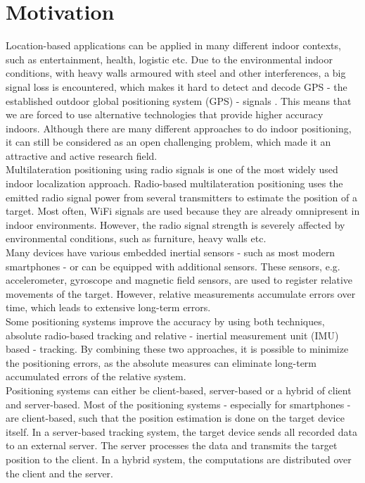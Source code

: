 \section{Motivation}
Location-based applications can be applied in many different indoor contexts, such as entertainment, health, logistic etc. Due to the environmental indoor conditions, with heavy walls armoured with steel and other interferences, a big signal loss is encountered, which makes it hard to detect and decode GPS - the established outdoor global positioning system (GPS) - signals \cite{GPSforIndoor}. This means that we are forced to use alternative technologies that provide higher accuracy indoors. Although there are many different approaches to do indoor positioning, it can still be considered as an open challenging problem, which made it an attractive and active research field.\\
\noindent\hspace*{5mm}%
Multilateration positioning using radio signals is one of the most widely used indoor localization approach. Radio-based multilateration positioning uses the emitted radio signal power from several transmitters to estimate the position of a target. Most often, WiFi signals are used because they are already omnipresent in indoor environments. However, the radio signal strength is severely affected by environmental conditions, such as furniture, heavy walls etc.\\
\noindent\hspace*{5mm}%
Many devices have various embedded inertial sensors - such as most modern smartphones - or can be equipped with additional sensors. These sensors, e.g. accelerometer, gyroscope and magnetic field sensors, are used to register relative movements of the target. However, relative measurements accumulate errors over time, which leads to extensive long-term errors.\\
\noindent\hspace*{5mm}%
Some positioning systems improve the accuracy by using both techniques, absolute radio-based tracking and relative - inertial measurement unit (IMU) based - tracking. By combining these two approaches, it is possible to minimize the positioning errors, as the absolute measures can eliminate long-term accumulated errors of the relative system. \\
\noindent\hspace*{5mm}%
Positioning systems can either be client-based, server-based or a hybrid of client and server-based. Most of the positioning systems - especially for smartphones - are client-based, such that the position estimation is done on the target device itself. In a server-based tracking system, the target device sends all recorded data to an external server. The server processes the data and transmits the target position to the client. In a hybrid system, the computations are distributed over the client and the server. \\
